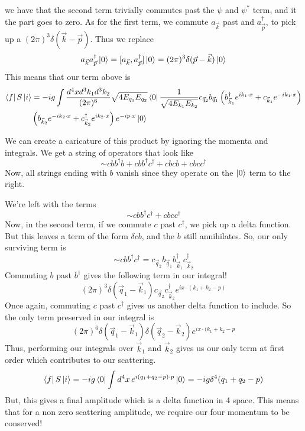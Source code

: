we have that the second term trivially commutes past the $ \psi $ and $ \psi ^ * $ term, and it 
the part goes to zero. As for the first term, 
we commute $ a_{ \vec{k} } $ past and $ a_{ \vec{p} }^ \dagger $, to pick up 
a $ ( 2 \pi ) ^ 3 \delta ( \vec{k} - \vec{p} ) $. 
Thus we replace 
\[
a_{ \vec{k} } a_{ \vec{p}  }^\dagger \ket{ 0 } = [ a_{ \vec{k} }, a_{ \vec{p} } ^ \dagger ] \ket{ 0 }  = ( 2 \pi ) ^ 3 \delta ( \vec{p}  - \vec{k} ) \ket{ 0 }  
\] This means that our term above is 
\begin{align*}
\bra{ f} S \ket{ i } &= - ig \int \frac{ d^ 4 x d^  3 k_1 d^ 3 k_ 2  }{ ( 2 \pi ) ^ 6} \sqrt{ 4 E_{ q_1 } E_{ q_2 }} \bra{ 0 }\frac{1}{ \sqrt{ 4 E_{ k_1 } E_{ k_2 } }} c_{ \vec{q}_2 } b_{ \vec{q}_1 } \left(  b_{\vec{k}_ 1 } ^ \dagger e^{ i k_1 \cdot  x } + c_{ \vec{k}_1 } e^{  - i k_1 \cdot  x } \right) \\
& \left( b_{ \vec{k}_ 2  } e^{ - i k_2 \cdot  x  } + c_{\vec{k}_ 2 }^\dagger e^{ i k_2 \cdot  x } \right) e^{ - i p \cdot  x } \ket{ 0 }  
\end{align*}

We can create a caricature of this product by ignoring the 
momenta and integrals. We get a string of operators 
that look like 
\[
\sim c b b ^\dagger b + c b b ^\dagger c^ \dagger + c  b c b + c b c c^\dagger 
\] Now, all strings ending with $ b $ vanish since they 
operate on the $ \ket{ 0 } $ term to the right. 

We're left with the terms 
\[
\sim c b b ^ \dagger c ^ \dagger + c b c c^ \dagger 
\] Now, in the second term, if we commute $ c $ past  $ c ^ \dagger$, 
we pick up a delta function. But this leaves a term of the form  $ \delta c b $, 
and the  $b  $ still annihilates. So, our only surviving term is 
\[
\sim c b b ^ \dagger c ^ \dagger = c_{ \vec{q} _ 2 } b_{ \vec{q}_ 1 }b_{ \vec{k} _ 1}^\dagger c_{ \vec{k} _ 2 }^\dagger  
\] Commuting $ b $ past $ b^ \dagger$ gives the following term in our integral!
\[
( 2 \pi ) ^ 3 \delta ( \vec{q}_ 1 - \vec{k}_ 1 ) c_{ \vec{q}_ 2 } c_{ \vec{k} _ 2 } ^ \dagger e^{ i x\cdot   ( k_1 + k_2 - p)  }
\] Once again, commuting $ c $ past $ c ^ \dagger $ gives us another delta function to include. 
So the only term preserved in our integral is 
\[
( 2 \pi ) ^ 6  \delta ( \vec{q}_ 1 - \vec{k}_ 1 ) \delta( \vec{q}_ 2 - \vec{k}_ 2 )  e^{ i x\cdot   ( k_1 + k_2 - p }
\] Thus, performing our integrals over $ \vec{k}_ 1 $ and $ \vec{k}_ 2 $ gives us our only term 
at first order which contributes to our scattering. 
\[
\bra{ f} S \ket{ i } =  - i g \bra{ 0 } \int d^ 4 x \, e^{ i ( q_1 + q_2 - p ) \cdot  p } \ket{ 0 }  = - ig \delta ^ 4 ( q_ 1 + q_ 2 - p ) 
\] But, this gives a final amplitude which is a delta function in 4 space. 
This means that for a non zero scattering amplitude, we require our four momentum to be conserved!

